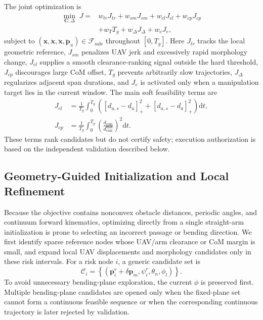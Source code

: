 \documentclass[journal,twoside]{IEEEtran}
\begin{document}
The joint optimization is
\begin{equation}
\begin{aligned}
\min_{\mathbf C,\Delta}\;J={}&w_{tr}J_{tr}+w_{sm}J_{sm}+w_{cl}J_{cl}
+w_{cp}J_{cp}\\
&+w_TT_g+w_\Delta J_\Delta+w_eJ_e,
\end{aligned}
\label{eq:joint_objective}
\end{equation}
subject to $(\mathbf x,\dot{\mathbf x},\ddot{\mathbf x},\dddot{\mathbf p}_u)\in\mathcal F_{\mathrm{safe}}$ throughout $[0,T_g]$. Here $J_{tr}$ tracks the local geometric reference, $J_{sm}$ penalizes UAV jerk and excessively rapid morphology change, $J_{cl}$ supplies a smooth clearance-ranking signal outside the hard threshold, $J_{cp}$ discourages large CoM offset, $T_g$ prevents arbitrarily slow trajectories, $J_\Delta$ regularizes adjacent span durations, and $J_e$ is activated only when a manipulation target lies in the current window. The main soft feasibility terms are
\begin{equation}
\begin{aligned}
J_{cl}&=\frac{1}{T_g}\int_0^{T_g}
\left([d_{u,s}-d_u]_+^2+[d_{a,s}-d_a]_+^2\right)\mathrm dt,\\
J_{cp}&=\frac{1}{T_g}\int_0^{T_g}
\left(\frac{d_{\mathrm{com}}}{d_{\mathrm{com}}^{\max}}\right)^2\mathrm dt.
\end{aligned}
\label{eq:soft_terms}
\end{equation}
These terms rank candidates but do not certify safety; execution authorization is based on the independent validation described below.

\subsection{Geometry-Guided Initialization and Local Refinement}
Because the objective contains nonconvex obstacle distances, periodic angles, and continuum forward kinematics, optimizing directly from a single straight-arm initialization is prone to selecting an incorrect passage or bending direction. We first identify sparse reference nodes whose UAV/arm clearance or CoM margin is small, and expand local UAV displacements and morphology candidates only in these risk intervals. For a risk node $i$, a generic candidate set is
\begin{equation}
\mathcal C_i=
\left\{(\mathbf p_i^r+\delta\mathbf p_m,\psi_i^r,\theta_n,\phi_l)\right\}.
\label{eq:candidate_set}
\end{equation}
To avoid unnecessary bending-plane exploration, the current $\phi$ is preserved first. Multiple bending-plane candidates are opened only when the fixed-plane set cannot form a continuous feasible sequence or when the corresponding continuous trajectory is later rejected by validation.
\end{document}
